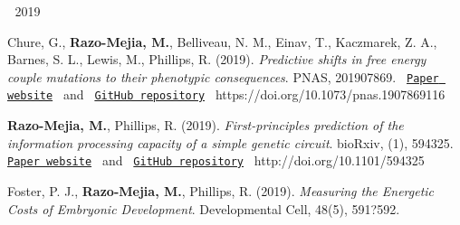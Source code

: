 
\begin{cventries}

  \cventry
    {$\;$}
    {2019}
    {$\;$}
    {$\;$}
    {
      \begin{cvitems} %
        \item {
        \begin{flushleft}
          Chure, G., \textbf{Razo-Mejia, M.}, Belliveau, N. M., Einav, T.,
          Kaczmarek, Z. A., Barnes, S. L., Lewis, M., Phillips, R. (2019).
          \textit{Predictive shifts in free energy couple mutations to their
          phenotypic consequences}. PNAS, 201907869.
          \texttt{
          \href{https://www.rpgroup.caltech.edu/mwc_mutants/}{Paper website} 
          }
          and
          \texttt{
          \href{https://github.com/RPGroup-PBoC/mwc_mutants}{GitHub repository}
          }
          \linebreak
          https://doi.org/10.1073/pnas.1907869116
        \end{flushleft}
        }
        \item {
          \begin{flushleft}
            \textbf{Razo-Mejia, M.}, Phillips, R. (2019).
            \textit{First-principles prediction of the information processing
            capacity of a simple genetic circuit}. bioRxiv, (1),
            594325.
            \texttt{
            \href{https://www.rpgroup.caltech.edu/chann_cap/}{Paper website} 
            }
            and
            \texttt{
            \href{https://github.com/RPGroup-PBoC/chann_cap}{GitHub repository}
            }
            \linebreak
            http://doi.org/10.1101/594325
          \end{flushleft}
        }
        \item {
          \begin{flushleft}
            Foster, P. J., \textbf{Razo-Mejia, M.}, Phillips, R. (2019).
            \textit{Measuring the Energetic Costs of Embryonic Development}.
            Developmental Cell, 48(5), 591?592.\linebreak

\end{flushleft}}
\end{cvitems}}
\end{cventries}
